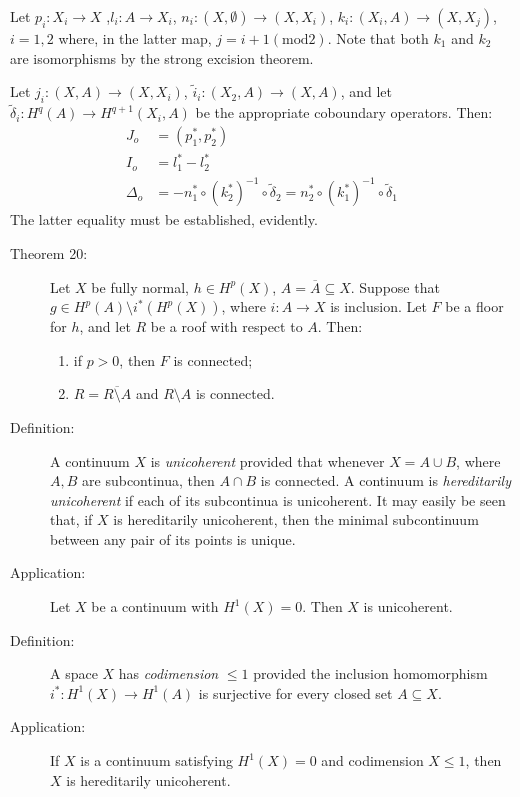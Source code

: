 \documentclass{article}
\begin{document}
Let $p_i: X_i \rightarrow X$ ,$l_i: A \rightarrow X_i$, $n_i: (X,\emptyset) \rightarrow (X,X_i)$, $k_i: (X_i,A) \rightarrow (X,X_j)$, $i=1,2$ where, in the latter map, $j = i + 1 (\text{mod} 2)$. Note that both $k_1$ and $k_2$ are isomorphisms by the strong excision theorem.

Let $j_i: (X,A) \rightarrow (X,X_i)$, $\tilde{i}_i: (X_2,A) \rightarrow (X,A)$, and let $\tilde{\delta}_i: H^q(A) \rightarrow H^{q+1} (X_i,A)$ be the appropriate coboundary operators. Then:
\begin{align*}
J_o & = (p_1^*,p_2^*) \\
I_o & = l_1^*-l_2^* \\
\Delta_o & = -n_1^* \circ (k_2^*)^{-1} \circ \tilde{\delta}_2=n_2^* \circ (k_1^*)^{-1} \circ \tilde{\delta}_1
\end{align*}
The latter equality must be established, evidently.

\begin{description}

\item[Theorem 20:] Let $X$ be fully normal, $h \in H^p(X)$, $A = \overline{A} \subseteq X$. Suppose that $g \in H^p(A) \setminus i^*(H^p(X))$, where $i: A \rightarrow X$ is inclusion. Let $F$ be a floor for $h$, and let $R$ be a roof with respect to $A$. Then:
  \begin{enumerate}[\hspace{1cm}(1)]
    \item if $p>0$, then $F$ is connected;
    \item $R = \overline{R \setminus A}$ and $R \setminus A$ is connected.
  \end{enumerate}

\item[Definition:] A continuum $X$ is \emph{unicoherent} provided that whenever $X = A \cup B$, where $A,B$ are subcontinua, then $A \cap B$ is connected. A continuum is \emph{hereditarily unicoherent} if each of its subcontinua is unicoherent. It may easily be seen that, if $X$ is hereditarily unicoherent, then the minimal subcontinuum between any pair of its points is unique.

\item[Application:] Let $X$ be a continuum with $H^1(X)=0$. Then $X$ is unicoherent.

\item[Definition:] A space $X$ has \emph{codimension} $\leq 1$ provided the inclusion homomorphism $i^*: H^1(X) \rightarrow H^1(A)$ is surjective for every closed set $A \subseteq X$.

\item[Application:] If $X$ is a continuum satisfying $H^1(X)=0$ and codimension $X \leq 1$, then $X$ is hereditarily unicoherent.

\end{description}
\end{document}
